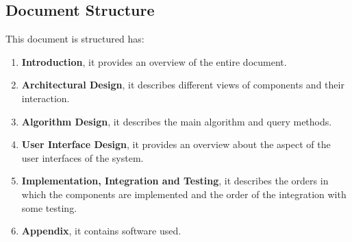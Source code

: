 \subsection{Document Structure}
This document is structured has:
\begin{enumerate}
	\item \textbf{Introduction}, it provides an overview of the entire document.
	\item \textbf{Architectural Design}, it describes different views of components and their interaction.
		\item \textbf{Algorithm Design}, it describes the main algorithm and query methods.
	\item \textbf{User Interface Design}, it provides an overview about the aspect of the user interfaces of the system.
	\item \textbf{Implementation, Integration and Testing}, it describes the orders in which the components are implemented and the order of the integration with some testing.
	\item \textbf{Appendix}, it contains software used.
\end{enumerate}




